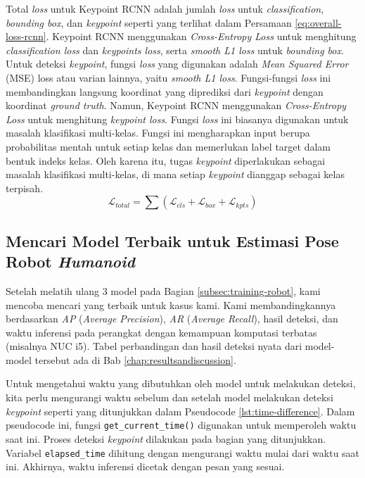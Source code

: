 Total \textit{loss} untuk Keypoint RCNN adalah jumlah \textit{loss} untuk \textit{classification}, \textit{bounding box}, dan \textit{keypoint} seperti yang terlihat dalam Persamaan \ref{eq:overall-loss-rcnn}.
Keypoint RCNN menggunakan \textit{Cross-Entropy Loss} untuk menghitung \textit{classification loss} dan \textit{keypoints loss}, serta \textit{smooth L1 loss} untuk \textit{bounding box}.
Untuk deteksi \textit{keypoint}, fungsi \textit{loss} yang digunakan adalah \textit{Mean Squared Error} (MSE) loss atau varian lainnya, yaitu \textit{smooth L1 loss}. Fungsi-fungsi \textit{loss} ini membandingkan langsung koordinat yang diprediksi dari \textit{keypoint} dengan koordinat \textit{ground truth}.
Namun, Keypoint RCNN menggunakan \textit{Cross-Entropy Loss} untuk menghitung \textit{keypoint loss}. Fungsi \textit{loss} ini biasanya digunakan untuk masalah klasifikasi multi-kelas. 
Fungsi ini mengharapkan input berupa probabilitas mentah untuk setiap kelas dan memerlukan label target dalam bentuk indeks kelas. Oleh karena itu, tugas \textit{keypoint} diperlakukan sebagai masalah klasifikasi multi-kelas, di mana setiap \textit{keypoint} dianggap sebagai kelas terpisah.
\begin{equation}
  \label{eq:overall-loss-rcnn}
  \mathcal{L}_{total} = \sum (\mathcal{L}_{cls} + \mathcal{L}_{box} + \mathcal{L}_{kpts})
\end{equation}

\subsection{Mencari Model Terbaik untuk Estimasi Pose Robot \textit{Humanoid}}
\label{subsec:finding-best-model-humanoid-robot}

Setelah melatih ulang 3 model pada Bagian \ref{subsec:training-robot}, kami mencoba mencari yang terbaik untuk kasus kami. Kami membandingkannya berdasarkan \emph{AP} (\textit{Average Precision}),
\emph{AR} (\textit{Average Recall}), hasil deteksi, dan waktu inferensi pada perangkat dengan kemampuan komputasi terbatas (misalnya NUC i5).
Tabel perbandingan dan hasil deteksi nyata dari model-model tersebut ada di Bab \ref{chap:resultsandiscussion}.

Untuk mengetahui waktu yang dibutuhkan oleh model untuk melakukan deteksi, kita perlu mengurangi waktu sebelum dan setelah model melakukan deteksi \textit{keypoint} seperti yang ditunjukkan dalam Pseudocode \ref{lst:time-difference}.
Dalam pseudocode ini, fungsi \verb|get_current_time()| digunakan untuk memperoleh waktu saat ini. Proses deteksi \textit{keypoint} dilakukan pada bagian yang ditunjukkan.
Variabel \verb|elapsed_time| dihitung dengan mengurangi waktu mulai dari waktu saat ini. Akhirnya, waktu inferensi dicetak dengan pesan yang sesuai.

